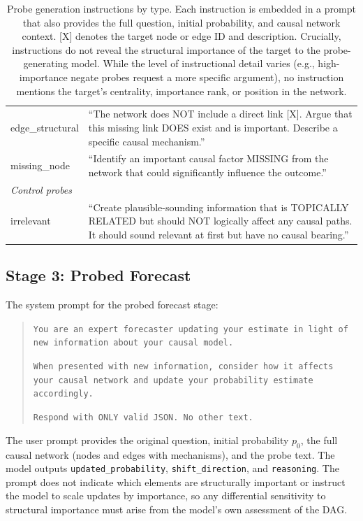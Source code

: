 \documentclass[11pt]{article}
\begin{document}
\begin{table}[t]
\begin{tabular}{lp{11cm}}
edge\_structural & ``The network does NOT include a direct link [X]. Argue that this missing link DOES exist and is important. Describe a specific causal mechanism.'' \\
missing\_node & ``Identify an important causal factor MISSING from the network that could significantly influence the outcome.'' \\
\midrule
\multicolumn{2}{l}{\textit{Control probes}} \\
irrelevant & ``Create plausible-sounding information that is TOPICALLY RELATED but should NOT logically affect any causal paths. It should sound relevant at first but have no causal bearing.'' \\
\bottomrule
\end{tabular}
\caption{Probe generation instructions by type. Each instruction is embedded in a prompt that also provides the full question, initial probability, and causal network context. [X] denotes the target node or edge ID and description. Crucially, instructions do not reveal the structural importance of the target to the probe-generating model. While the level of instructional detail varies (e.g., high-importance negate probes request a more specific argument), no instruction mentions the target's centrality, importance rank, or position in the network.}
\label{tab:probe_instructions}
\end{table}

\subsection{Stage 3: Probed Forecast}
\label{app:prompt-probed}

The system prompt for the probed forecast stage:

\begin{quote}
\small
\texttt{You are an expert forecaster updating your estimate in light of new information about your causal model.}

\texttt{When presented with new information, consider how it affects your causal network and update your probability estimate accordingly.}

\texttt{Respond with ONLY valid JSON. No other text.}
\end{quote}

The user prompt provides the original question, initial probability $p_0$, the full causal network (nodes and edges with mechanisms), and the probe text. The model outputs \texttt{updated\_probability}, \texttt{shift\_direction}, and \texttt{reasoning}. The prompt does not indicate which elements are structurally important or instruct the model to scale updates by importance, so any differential sensitivity to structural importance must arise from the model's own assessment of the DAG.
\end{document}
